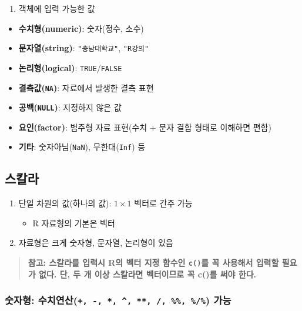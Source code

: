 \documentclass[11pt,a4paper]{book}
\providecommand{\tightlist}{%
  \setlength{\itemsep}{0pt}\setlength{\parskip}{0pt}}
\theoremstyle{definition}
\theoremstyle{definition}
\theoremstyle{definition}
\theoremstyle{remark}
\begin{document}
\begin{enumerate}
\def\labelenumi{\arabic{enumi}.}
\setcounter{enumi}{1}
\tightlist
\item
  객체에 입력 가능한 값
\end{enumerate}

\begin{itemize}
\item
  \textbf{수치형(numeric)}: 숫자(정수, 소수)
\item
  \textbf{문자열(string)}: \texttt{"충남대학교"}, \texttt{"R강의"}
\item
  \textbf{논리형(logical)}: \texttt{TRUE}/\texttt{FALSE}
\item
  \textbf{결측값(\texttt{NA})}: 자료에서 발생한 결측 표현
\item
  \textbf{공백(\texttt{NULL})}: 지정하지 않은 값
\item
  \textbf{요인(factor)}: 범주형 자료 표현(수치 + 문자 결합 형태로
  이해하면 편함)
\item
  \textbf{기타}: 숫자아님(\texttt{NaN}), 무한대(\texttt{Inf}) 등
\end{itemize}

\subsection{스칼라}

\begin{enumerate}
\def\labelenumi{\arabic{enumi}.}
\tightlist
\item
  단일 차원의 값(하나의 값): \(1 \times 1\) 벡터로 간주 가능

  \begin{itemize}
  \tightlist
  \item
    R 자료형의 기본은 벡터
  \end{itemize}
\item
  자료형은 크게 숫자형, 문자열, 논리형이 있음
\end{enumerate}

\begin{quote}
\textbf{참고: 스칼라를 입력시 R의 벡터 지정 함수인 \texttt{c()}를 꼭
사용해서 입력할 필요가 없다. 단, 두 개 이상 스칼라면 벡터이므로 꼭 c()를
써야 한다.}
\end{quote}

\subsubsection{\texorpdfstring{숫자형:
수치연산(\texttt{+,\ -,\ *,\ \^{},\ **,\ /,\ \%\%,\ \%/\%})
가능}{숫자형: 수치연산(+, -, *, \^{}, **, /, \%\%, \%/\%) 가능}}\label{----}
\end{document}
